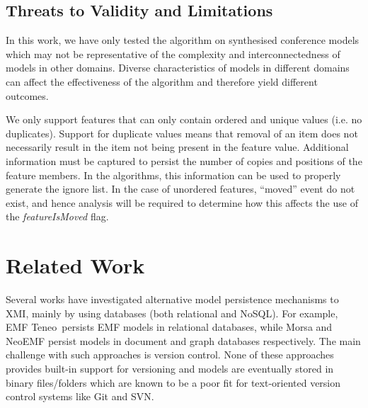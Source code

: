 \documentclass{llncs}
\begin{document}
\subsection{Threats to Validity and Limitations}
\label{sec:limitations_and_future_work}
In this work, we have only tested the algorithm on synthesised conference models which may not be representative of the complexity and interconnectedness of models in other domains. Diverse characteristics of models in different domains can affect the effectiveness of the algorithm and therefore yield different outcomes. %

We only support features that can only contain ordered and unique values (i.e. no duplicates).
Support for duplicate values means that removal of an item does not necessarily result in the item not being present in the feature value.
Additional information must be captured to persist the number of copies and positions of the feature members.
In the algorithms, this information can be used to properly generate the ignore list.
In the case of unordered features, ``moved'' event do not exist, and hence analysis will be required to determine how this affects the use of the \emph{featureIsMoved} flag. 


\section{Related Work}
\label{sec:related_work}

Several works have investigated alternative model persistence mechanisms to XMI, mainly by using databases (both relational and NoSQL). For example, EMF Teneo\,\cite{eclipse2017teneo} persists EMF models in relational databases, while Morsa \cite{pagan2011morsa} and NeoEMF \cite{daniel2016neoemf} persist models in document and graph databases respectively. The main challenge with such approaches is version control. None of these approaches provides built-in support for versioning and models are eventually stored in binary files/folders which are known to be a poor fit for text-oriented version control systems like Git and SVN.
\end{document}
